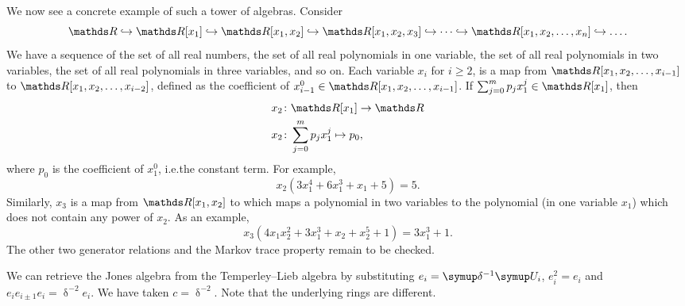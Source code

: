 We now see a concrete example of such a tower of algebras. Consider \[\R \hookrightarrow \R[x_1] \hookrightarrow \R[x_1, x_2] \hookrightarrow \R[x_1, x_2, x_3] \hookrightarrow \cdots \hookrightarrow \R[x_1, x_2, \ldots, x_n] \hookrightarrow \ldots.\] We have a sequence of the set of all real numbers, the set of all real polynomials in one variable, the set of all real polynomials in two variables, the set of all real polynomials in three variables, and so on. Each variable \(x_i\) for \(i\geq 2\), is a map from \(\R[x_1, x_2, \ldots, x_{i-1}]\) to \(\R[x_1, x_2, \ldots, x_{i-2}]\), defined as the coefficient of \(x_{i-1}^0 \in \R[x_1, x_2, \ldots, x_{i-1}]\). If \(\sum_{j=0}^{m}p_j x^{j}_1 \in \R[x_1]\), then
\begin{align*}
    x_2 &\colon \R[x_1] \rightarrow \R\\
	x_2 &\colon \sum_{j=0}^{m}p_j x^{j}_1 \mapsto p_0,
\end{align*}
where \(p_0\) is the coefficient of \(x_1^0\), i.e.\@ the constant term. For example, \[x_2 (3x_1^4 + 6x_1^3 + x_1 + 5) = 5.\] Similarly, \(x_3\) is a map from \(\R[x_1, x_2]\) to which maps a polynomial in two variables to the polynomial (in one variable \(x_1\)) which does not contain any power of \(x_2\). As an example, \[x_3(4x_1x_2^2 + 3x_1^3 + x_2 + x_2^5 + 1) = 3x_1^3 + 1.\] The other two generator relations and the Markov trace property remain to be checked.

We can retrieve the Jones algebra from the Temperley--Lieb algebra by substituting \(e_i = \updelta^{-1} \U_i\), \(e_i^2 = e_i\) and \(e_ie_{i\pm 1} e_i = \updelta^{-2}e_i\). We have taken \(c = \updelta^{-2}\). Note that the underlying rings are different.

